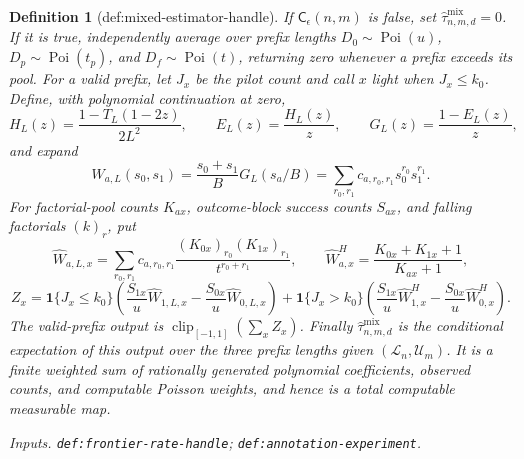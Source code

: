 \documentclass{article}
\newtheorem{definition}{Definition}
\begin{document}
\begin{definition}[def:mixed-estimator-handle]
If \(\mathsf C_\epsilon(n,m)\) is false, set \(\widehat\tau^{\mathrm{mix}}_{n,m,d}=0\).  If it is true, independently average over prefix lengths \(D_0\sim\operatorname{Poi}(u)\), \(D_p\sim\operatorname{Poi}(t_p)\), and \(D_f\sim\operatorname{Poi}(t)\), returning zero whenever a prefix exceeds its pool.  For a valid prefix, let \(J_x\) be the pilot count and call \(x\) light when \(J_x\le k_0\).  Define, with polynomial continuation at zero,
\[
 H_L(z)=\frac{1-T_L(1-2z)}{2L^2},\qquad
 E_L(z)=\frac{H_L(z)}z,\qquad G_L(z)=\frac{1-E_L(z)}z,
\]
and expand
\[
 W_{a,L}(s_0,s_1)=\frac{s_0+s_1}{B}G_L(s_a/B)
 =\sum_{r_0,r_1}c_{a,r_0,r_1}s_0^{r_0}s_1^{r_1}.
\]
For factorial-pool counts \(K_{ax}\), outcome-block success counts \(S_{ax}\), and falling factorials \((k)_r\), put
\[
 \widehat W_{a,L,x}=\sum_{r_0,r_1}c_{a,r_0,r_1}
 \frac{(K_{0x})_{r_0}(K_{1x})_{r_1}}{t^{r_0+r_1}},
 \qquad
 \widehat W^H_{a,x}=\frac{K_{0x}+K_{1x}+1}{K_{ax}+1},
\]
\[
 Z_x=\mathbf1\{J_x\le k_0\}
 \left(\frac{S_{1x}}u\widehat W_{1,L,x}-\frac{S_{0x}}u\widehat W_{0,L,x}\right)
 +\mathbf1\{J_x>k_0\}
 \left(\frac{S_{1x}}u\widehat W^H_{1,x}-\frac{S_{0x}}u\widehat W^H_{0,x}\right).
\]
The valid-prefix output is \(\operatorname{clip}_{[-1,1]}(\sum_xZ_x)\).  Finally \(\widehat\tau^{\mathrm{mix}}_{n,m,d}\) is the conditional expectation of this output over the three prefix lengths given \((\mathcal L_n,\mathcal U_m)\).  It is a finite weighted sum of rationally generated polynomial coefficients, observed counts, and computable Poisson weights, and hence is a total computable measurable map.
\par\smallskip\noindent\emph{Inputs.} \texttt{def:\allowbreak{}frontier-\allowbreak{}rate-\allowbreak{}handle}; \texttt{def:\allowbreak{}annotation-\allowbreak{}experiment}.
\end{definition}
\end{document}
